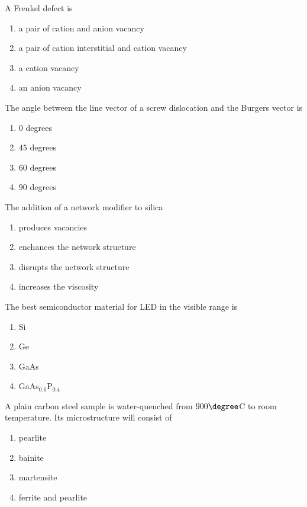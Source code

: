 \item A Frenkel defect is

\begin{enumerate}
	\item a pair of cation and anion vacancy
	\item a pair of cation interstitial and cation vacancy
	\item a cation vacancy
	\item an anion vacancy
\end{enumerate}

\item The angle between the line vector of a screw dislocation and the Burgers vector is

\begin{enumerate}
	\item $0$ degrees
	\item $45$ degrees
	\item $60$ degrees
	\item $90$ degrees
\end{enumerate}

\item The addition of a network modifier to silica

\begin{enumerate}
	\item produces vacancies
	\item enchances the network structure
	\item disrupts the network structure
	\item increases the viscosity
\end{enumerate}

\item The best semiconductor material for LED in the visible range is

\begin{enumerate}
	\item Si
	\item Ge
	\item GaAs
	\item GaAs$_{0.6}$P$_{0.4}$
\end{enumerate}

\item A plain carbon steel sample is water-quenched from $900\degree$C to room temperature. Its microstructure will consist of

\begin{enumerate}
	\item pearlite
	\item bainite
	\item martensite
	\item ferrite and pearlite
\end{enumerate}

